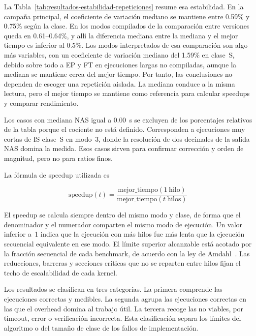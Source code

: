 La Tabla~\ref{tab:resultados-estabilidad-repeticiones} resume esa estabilidad.
En la campaña principal, el coeficiente de variación mediano se mantiene entre
0.59\% y 0.75\% según la clase. En los modos compilados de la comparación entre
versiones queda en 0.61--0.64\%, y allí la diferencia mediana entre la mediana y
el mejor tiempo es inferior al 0.5\%. Los modos interpretados de esa comparación
son algo más variables, con un coeficiente de variación mediano del 1.59\% en
clase~S, debido sobre todo a EP y FT en ejecuciones largas no compiladas, aunque
la mediana se mantiene cerca del mejor tiempo. Por tanto, las conclusiones no dependen
de escoger una repetición aislada. La mediana conduce a la misma lectura, pero el
mejor tiempo se mantiene como referencia para calcular speedups y comparar
rendimiento.



Los casos con mediana NAS igual a 0.00~s se excluyen de los porcentajes relativos
de la tabla porque el cociente no está definido. Corresponden a ejecuciones muy
cortas de IS clase~S en modo~3, donde la resolución de dos decimales de la salida
NAS domina la medida. Esos casos sirven para confirmar corrección y orden de
magnitud, pero no para ratios finos.

La fórmula de speedup utilizada es

\begin{equation}
\mathrm{speedup}(t) =
  \frac{\mathrm{mejor\_tiempo}(1~\mathrm{hilo})}
       {\mathrm{mejor\_tiempo}(t~\mathrm{hilos})}
\end{equation}

El speedup se calcula siempre dentro del mismo modo y clase, de forma que el
denominador y el numerador comparten el mismo modo de ejecución. Un valor
inferior a~1 indica que la ejecución con más hilos fue más lenta que la
ejecución secuencial equivalente en ese modo. El límite superior alcanzable está
acotado por la fracción secuencial de cada benchmark, de acuerdo con la ley de
Amdahl~\cite{Amdahl1967}. Las reducciones, barreras y secciones críticas que no
se reparten entre hilos fijan el techo de escalabilidad de cada kernel.

Los resultados se clasifican en tres categorías. La primera comprende las
ejecuciones correctas y medibles. La segunda agrupa las ejecuciones correctas en
las que el overhead domina al trabajo útil. La tercera recoge las no viables, por
timeout, error o verificación incorrecta. Esta clasificación separa los límites
del algoritmo o del tamaño de clase de los fallos de implementación.


